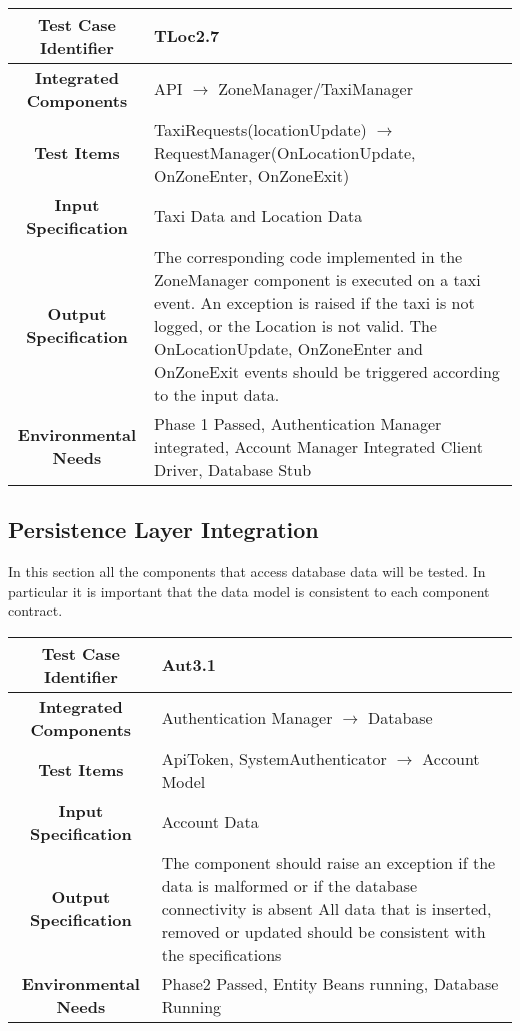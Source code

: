 \documentclass[11pt, a4paper,titlepage]{article}
\begin{document}
	 \subsubsection{}
	 \begin{tabularx}{\textwidth}{| c|X|}
	 	\hline \textbf{Test Case Identifier} & \label{TLoc2.7}TLoc2.7\\
	 	\hline \textbf{Integrated Components} & API  $\rightarrow $  ZoneManager/TaxiManager \\
	 	\hline \textbf{Test Items} & TaxiRequests(locationUpdate) $\rightarrow $ RequestManager(OnLocationUpdate, OnZoneEnter, OnZoneExit) \\
	 	\hline \textbf{Input Specification} & Taxi Data and Location Data \\
	 	\hline \textbf{Output Specification} & The corresponding code implemented in the ZoneManager component is executed on a taxi event. 
	 	\newline An exception is raised if the taxi is not logged, or the Location is not valid. \newline
	 	The OnLocationUpdate, OnZoneEnter and OnZoneExit events should be triggered according to the input data. \\
	 	\hline \textbf{Environmental Needs} &  Phase 1 Passed, Authentication Manager integrated, Account Manager Integrated \newline 
	 	Client Driver, Database Stub\\
	 	\hline
	 \end{tabularx}
	 \newline
	 	\newpage
	\subsection{Persistence Layer Integration}
		In this section all the components that access database data will be tested. In particular it is important that the data model is consistent to each component contract.
		\newline
		\begin{tabularx}{\textwidth}{| c|X|}
			\hline \textbf{Test Case Identifier} & \label{Aut3.1}Aut3.1 \\
			\hline \textbf{Integrated Components} & Authentication Manager $\rightarrow $ Database \\
			\hline \textbf{Test Items} & ApiToken, SystemAuthenticator $\rightarrow $ Account Model \\
			\hline \textbf{Input Specification} & Account Data \\
			\hline \textbf{Output Specification} & The component should raise an exception if the data is malformed or if the database connectivity is absent \newline
			All data that is inserted, removed or updated should be consistent with the specifications\\
			\hline \textbf{Environmental Needs} & Phase2 Passed, Entity Beans running, Database Running \\
			\hline
		\end{tabularx}
		\newline
\end{document}
